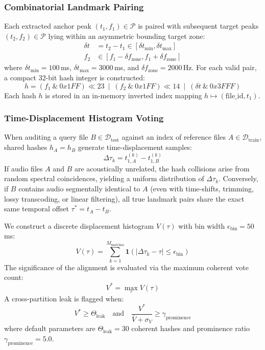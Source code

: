 \documentclass[10pt,journal,compsoc]{IEEEtran}
\begin{document}
\subsubsection{Combinatorial Landmark Pairing}
Each extracted anchor peak $(t_1, f_1) \in \mathcal{P}$ is paired with subsequent target peaks $(t_2, f_2) \in \mathcal{P}$ lying within an asymmetric bounding target zone:
\begin{align}
\delta t &= t_2 - t_1 \in [\delta t_{\min}, \delta t_{\max}] \\
f_2 &\in [f_1 - \delta f_{\text{zone}}, f_1 + \delta f_{\text{zone}}]
\end{align}
where $\delta t_{\min} = 100$\,ms, $\delta t_{\max} = 3000$\,ms, and $\delta f_{\text{zone}} = 2000$\,Hz. For each valid pair, a compact 32-bit hash integer is constructed:
\begin{equation}
h = (f_1 \ \& \ 0x1FF) \ll 23 \ \mid \ (f_2 \ \& \ 0x1FF) \ll 14 \ \mid \ (\delta t \ \& \ 0x3FFF)
\label{eq:hash}
\end{equation}
Each hash $h$ is stored in an in-memory inverted index mapping $h \mapsto (\text{file\_id}, t_1)$.

\subsubsection{Time-Displacement Histogram Voting}
When auditing a query file $B \in \mathcal{D}_{\text{test}}$ against an index of reference files $A \in \mathcal{D}_{\text{train}}$, shared hashes $h_A = h_B$ generate time-displacement samples:
\begin{equation}
\Delta \tau_k = t_{1, A}^{(k)} - t_{1, B}^{(k)}
\label{eq:time_delta}
\end{equation}
If audio files $A$ and $B$ are acoustically unrelated, the hash collisions arise from random spectral coincidences, yielding a uniform distribution of $\Delta \tau_k$. Conversely, if $B$ contains audio segmentally identical to $A$ (even with time-shifts, trimming, lossy transcoding, or linear filtering), all true landmark pairs share the exact same temporal offset $\tau^* = t_{A} - t_{B}$.

We construct a discrete displacement histogram $V(\tau)$ with bin width $\epsilon_{\text{bin}} = 50$\,ms:
\begin{equation}
V(\tau) = \sum_{k=1}^{M_{\text{matches}}} \mathbf{1}(|\Delta \tau_k - \tau| \le \epsilon_{\text{bin}})
\label{eq:vote_hist}
\end{equation}
The significance of the alignment is evaluated via the maximum coherent vote count:
\begin{equation}
V^* = \max_\tau V(\tau)
\label{eq:max_votes}
\end{equation}
A cross-partition leak is flagged when:
\begin{equation}
V^* \ge \Theta_{\text{leak}} \quad \text{and} \quad \frac{V^*}{\bar{V} + \sigma_V} \ge \gamma_{\text{prominence}}
\label{eq:leak_criterion}
\end{equation}
where default parameters are $\Theta_{\text{leak}} = 30$ coherent hashes and prominence ratio $\gamma_{\text{prominence}} = 5.0$.
\end{document}
